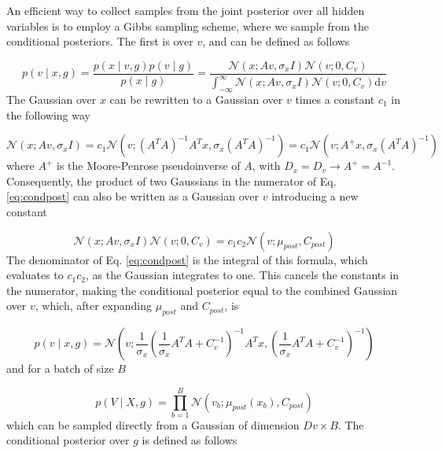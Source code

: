 \documentclass{paper}
\begin{document}
An efficient way to collect samples from the joint posterior over all hidden variables is to employ a Gibbs sampling scheme, where we sample from the conditional posteriors. The first is over $v$, and can be defined as follows

\begin{equation} \label{eq:condpost}
p(v \mid x,g) = \frac{p(x \mid v,g) p(v \mid g)}{p(x \mid g)} = \frac{\mathcal{N}(x;Av,\sigma_x I) \mathcal{N}(v;0,C_v)}{\int_{-\infty}^{\infty} \mathcal{N}(x;Av,\sigma_x I) \mathcal{N}(v;0,C_v) \mathrm{d}v}
\end{equation}
%
The Gaussian over $x$ can be rewritten to a Gaussian over $v$ times a constant $c_1$ in the following way

\begin{equation}
\mathcal{N}(x;Av,\sigma_x I) = c_1 \mathcal{N}(v; (A^T A)^{-1} A^T x, \sigma_x (A^T A)^{-1}) = c_1 \mathcal{N}(v; A^{+} x, \sigma_x (A^T A)^{-1})
\end{equation}
%
where $A^{+}$ is the Moore-Penrose pseudoinverse of $A$, with $D_x = D_v \rightarrow A^{+} = A^{-1}$. Consequently, the product of two Gaussians in the numerator of Eq. \ref{eq:condpost} can also be written as a Gaussian over $v$ introducing a new constant

\begin{equation}
\mathcal{N}(x;Av,\sigma_x I) \mathcal{N}(v;0,C_v) = c_1 c_2 \mathcal{N}(v; \mu_{post},C_{post})
\end{equation}
%
The denominator of Eq. \ref{eq:condpost} is the integral of this formula, which evaluates to $c_1c_2$, as the Gaussian integrates to one. This cancels the constants in the numerator, making the conditional posterior equal to the combined Gaussian over $v$, which, after expanding $\mu_{post}$ and $C_{post}$, is

\begin{equation}
p(v \mid x,g) = \mathcal{N}\left(v; \frac{1}{\sigma_x} \left(\frac{1}{\sigma_x} A^T A + C_v^{-1}\right)^{-1} A^T x, \left(\frac{1}{\sigma_x} A^T A + C_v^{-1}\right)^{-1}\right)
\end{equation}
%
and for a batch of size $B$

\begin{equation}
p(V \mid X,g) = \prod_{b=1}^B \mathcal{N} \left(v_b; \mu_{post}(x_b),C_{post} \right)
\end{equation}
%
which can be sampled directly from a Gaussian of dimension $Dv \times B$. The conditional posterior over $g$ is defined as follows
\end{document}
